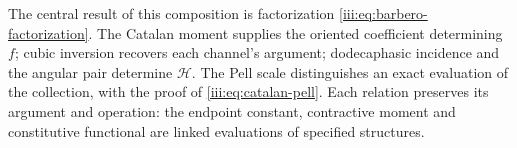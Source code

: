 The central result of this composition is factorization
\eqref{iii:eq:barbero-factorization}. The Catalan moment supplies the
oriented coefficient determining $f$; cubic inversion recovers
each channel's argument; dodecaphasic incidence and the angular pair
determine $\mathcal H$. The Pell scale distinguishes an exact
evaluation of the collection, with the proof of
\eqref{iii:eq:catalan-pell}. Each relation preserves its argument and
operation: the endpoint constant, contractive moment and constitutive
functional are linked evaluations of specified
structures.
